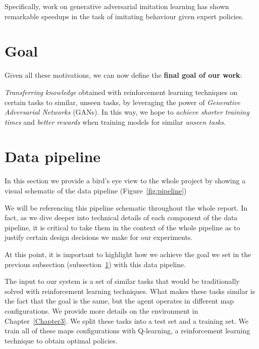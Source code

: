 Specifically, work on generative adversarial imitation learning \parencite{ho2016generative} has shown remarkable speedups in the task of imitating behaviour given expert policies.

\section{Goal}
\label{goal}
Given all these motivations, we can now define the \textbf{final goal of our work}: \\

\begin{addmargin}[3em]{3em}
\emph{Transferring knowledge} obtained with reinforcement learning techniques on certain tasks to similar, unseen tasks, by leveraging the power of \emph{Generative Adversarial Networks} (GANs). In this way, we hope to \emph{achieve shorter training times} and \emph{better rewards} when training models for similar \emph{unseen tasks}.
\end{addmargin}


\section{Data pipeline}
\label{sec:datapipeline}
In this section we provide a bird's eye view to the whole project by showing a visual schematic of the data pipeline (Figure~\ref{fig:pipeline})

We will be referencing this pipeline schematic throughout the whole report. In fact, as we dive deeper into technical details of each component of the data pipeline, it is critical to take them in the context of the whole pipeline as to justify certain design decisions we make for our experiments.

At this point, it is important to highlight how we achieve the goal we set in the previous subsection (subsection~\ref{goal}) with this data pipeline.

The input to our system is a set of similar tasks that would be traditionally solved with reinforcement learning techniques. What makes these tasks similar is the fact that the goal is the same, but the agent operates in different map configurations. We provide more details on the environment in Chapter~\ref{Chapter3}.
We split these tasks into a test set and a training set. We train all of these maps configurations with Q-learning, a reinforcement learning technique to obtain optimal policies. 

